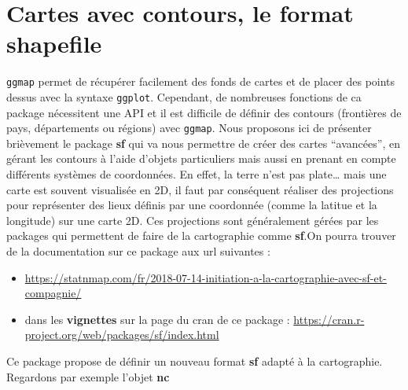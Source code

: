 \documentclass[]{book}
\providecommand{\tightlist}{%
  \setlength{\itemsep}{0pt}\setlength{\parskip}{0pt}}
\theoremstyle{definition}
\theoremstyle{definition}
\theoremstyle{definition}
\theoremstyle{remark}
\begin{document}
\hypertarget{cartes-avec-contours-le-format-shapefile}{%
\section{Cartes avec contours, le format shapefile}\label{cartes-avec-contours-le-format-shapefile}}

\texttt{ggmap} permet de récupérer facilement des fonds de cartes et de placer des points dessus avec la syntaxe \texttt{ggplot}. Cependant, de nombreuses fonctions de ca package nécessitent une API et il est difficile de définir des contours (frontières de pays, départements ou régions) avec \texttt{ggmap}. Nous proposons ici de présenter brièvement le package \textbf{sf} qui va nous permettre de créer des cartes ``avancées'', en gérant les contours à l'aide d'objets particuliers mais aussi en prenant en compte différents systèmes de coordonnées. En effet, la terre n'est pas plate\ldots{} mais une carte est souvent visualisée en 2D, il faut par conséquent réaliser des projections pour représenter des lieux définis par une coordonnée (comme la latitue et la longitude) sur une carte 2D. Ces projections sont généralement gérées par les packages qui permettent de faire de la cartographie comme \textbf{sf}.On pourra trouver de la documentation sur ce package aux url suivantes :

\begin{itemize}
\tightlist
\item
  \url{https://statnmap.com/fr/2018-07-14-initiation-a-la-cartographie-avec-sf-et-compagnie/}
\item
  dans les \textbf{vignettes} sur la page du cran de ce package : \url{https://cran.r-project.org/web/packages/sf/index.html}
\end{itemize}

Ce package propose de définir un nouveau format \textbf{sf} adapté à la cartographie. Regardons par exemple l'objet \textbf{nc}
\end{document}
